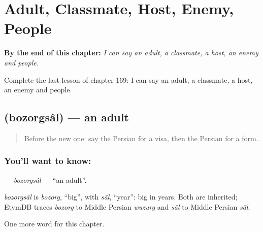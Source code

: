 
\chapter{Adult, Classmate, Host, Enemy, People}
\label{ch:fa-adult-classmate-host-enemy-people}

\begin{chapteropening}
\textbf{By the end of this chapter:} \emph{I can say an adult, a classmate, a host, an enemy and people.}

Complete the last lesson of chapter 169: I can say an adult, a classmate, a host, an enemy and people.
\end{chapteropening}

\section[\texorpdfstring{\fa{بزرگسال} (bozorgsâl)}{بزرگسال (bozorgsâl)}]{ (bozorgsâl) — an adult}

\label{lesson:FA-C169-bozorgsal}



\begin{quote}
Before the new one: say the Persian for a visa, then the Persian for a form.
\end{quote}

\subsection*{You'll want to know: }
\textbf{} — \emph{bozorgsâl} — \textquotedblleft{}an adult\textquotedblright{}.

\begin{cousinweb}
\emph{bozorgsâl} is \emph{bozorg}, \textquotedblleft{}big\textquotedblright{}, with \emph{sâl}, \textquotedblleft{}year\textquotedblright{}: big in years. Both are inherited; EtymDB traces \emph{bozorg} to Middle Persian \emph{wuzurg} and \emph{sâl} to Middle Persian \emph{sāl}.
\end{cousinweb}

\begin{grammarlens}[title={What you've built}]
One more word for this chapter.
\end{grammarlens}

